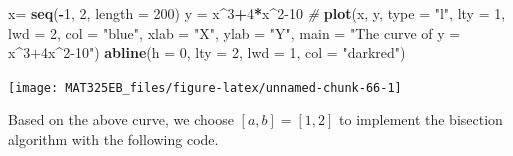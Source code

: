 \documentclass[
]{book}
\newenvironment{Shaded}{\begin{snugshade}}{\end{snugshade}}
\newcommand{\AttributeTok}[1]{\textcolor[rgb]{0.13,0.29,0.53}{#1}}
\newcommand{\CommentTok}[1]{\textcolor[rgb]{0.56,0.35,0.01}{\textit{#1}}}
\newcommand{\DecValTok}[1]{\textcolor[rgb]{0.00,0.00,0.81}{#1}}
\newcommand{\FunctionTok}[1]{\textcolor[rgb]{0.13,0.29,0.53}{\textbf{#1}}}
\newcommand{\NormalTok}[1]{#1}
\newcommand{\OtherTok}[1]{\textcolor[rgb]{0.56,0.35,0.01}{#1}}
\newcommand{\SpecialCharTok}[1]{\textcolor[rgb]{0.81,0.36,0.00}{\textbf{#1}}}
\newcommand{\StringTok}[1]{\textcolor[rgb]{0.31,0.60,0.02}{#1}}
\begin{document}
\begin{Shaded}
\begin{Highlighting}[]
\NormalTok{x}\OtherTok{=} \FunctionTok{seq}\NormalTok{(}\SpecialCharTok{{-}}\DecValTok{1}\NormalTok{, }\DecValTok{2}\NormalTok{, }\AttributeTok{length =} \DecValTok{200}\NormalTok{)}
\NormalTok{y }\OtherTok{=}\NormalTok{ x}\SpecialCharTok{\^{}}\DecValTok{3}\SpecialCharTok{+}\DecValTok{4}\SpecialCharTok{*}\NormalTok{x}\SpecialCharTok{\^{}}\DecValTok{2{-}10}
\CommentTok{\#}
\FunctionTok{plot}\NormalTok{(x, y, }
     \AttributeTok{type =} \StringTok{"l"}\NormalTok{,}
     \AttributeTok{lty =} \DecValTok{1}\NormalTok{,}
     \AttributeTok{lwd =} \DecValTok{2}\NormalTok{,}
     \AttributeTok{col =} \StringTok{"blue"}\NormalTok{,}
     \AttributeTok{xlab =} \StringTok{"X"}\NormalTok{,}
     \AttributeTok{ylab =} \StringTok{"Y"}\NormalTok{,}
     \AttributeTok{main =} \StringTok{"The curve of y = x\^{}3+4x\^{}2{-}10"}\NormalTok{)}
\FunctionTok{abline}\NormalTok{(}\AttributeTok{h =} \DecValTok{0}\NormalTok{, }\AttributeTok{lty =} \DecValTok{2}\NormalTok{, }\AttributeTok{lwd =} \DecValTok{1}\NormalTok{, }\AttributeTok{col =} \StringTok{"darkred"}\NormalTok{)}
\end{Highlighting}
\end{Shaded}

\begin{center}\texttt{[image: MAT325EB\_files/figure-latex/unnamed-chunk-66-1]} \end{center}

Based on the above curve, we choose \([a, b] = [1,2]\) to implement the bisection algorithm with the following code.
\end{document}
